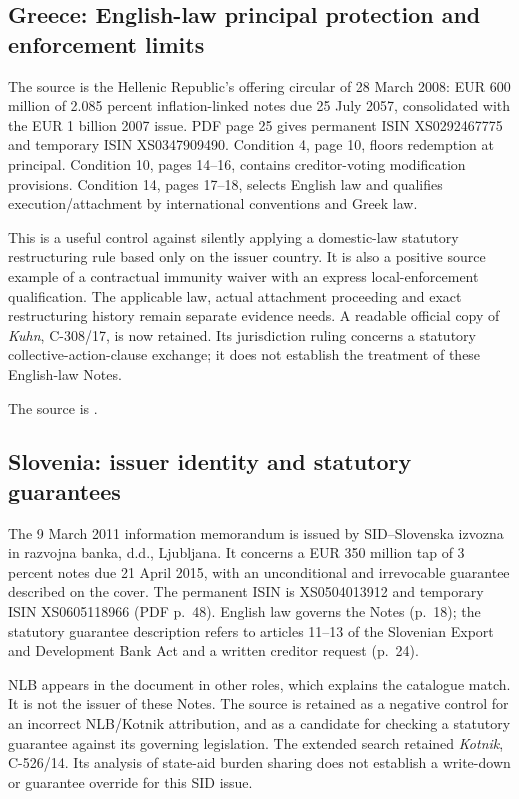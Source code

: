 \documentclass[12pt,a4paper,oneside,openany]{book}
\begin{document}
\subsection{Greece: English-law principal protection and enforcement limits}

The source is the Hellenic Republic's offering circular of 28 March 2008:
EUR 600 million of 2.085 percent inflation-linked notes due 25 July 2057,
consolidated with the EUR 1 billion 2007 issue. PDF page 25 gives permanent
ISIN XS0292467775 and temporary ISIN XS0347909490. Condition 4, page 10,
floors redemption at principal. Condition 10, pages 14--16, contains
creditor-voting modification provisions. Condition 14, pages 17--18, selects
English law and qualifies execution/attachment by international conventions
and Greek law.

This is a useful control against silently applying a domestic-law statutory
restructuring rule based only on the issuer country. It is also a positive
source example of a contractual immunity waiver with an express
local-enforcement qualification. The applicable law, actual attachment
proceeding and exact restructuring history remain separate evidence needs.
A readable official copy of \emph{Kuhn}, C-308/17, is now retained. Its
jurisdiction ruling concerns a statutory collective-action-clause exchange;
it does not establish the treatment of these English-law Notes.

The source is
.

\subsection{Slovenia: issuer identity and statutory guarantees}

The 9 March 2011 information memorandum is issued by SID--Slovenska izvozna
in razvojna banka, d.d., Ljubljana. It concerns a EUR 350 million tap of
3 percent notes due 21 April 2015, with an unconditional and irrevocable
guarantee described on the cover. The permanent ISIN is XS0504013912 and
temporary ISIN XS0605118966 (PDF p.~48). English law governs the Notes
(p.~18); the statutory guarantee description refers to articles 11--13 of
the Slovenian Export and Development Bank Act and a written creditor
request (p.~24).

NLB appears in the document in other roles, which explains the catalogue
match. It is not the issuer of these Notes. The source is retained as a
negative control for an incorrect NLB/Kotnik attribution, and as a candidate
for checking a statutory guarantee against its governing legislation.
The extended search retained \emph{Kotnik}, C-526/14. Its analysis of
state-aid burden sharing does not establish a write-down or guarantee
override for this SID issue.
\end{document}
